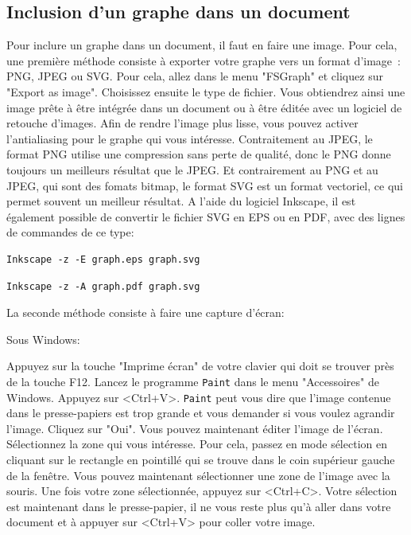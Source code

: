\subsection{Inclusion d’un graphe dans un document}
Pour inclure un graphe dans un document, il faut en faire une image. Pour cela, une
première méthode consiste à exporter votre graphe vers un format d'image~: PNG, JPEG ou SVG. Pour
cela, allez dans le menu "FSGraph" et cliquez sur "Export as image". Choisissez ensuite le type de
fichier. Vous obtiendrez ainsi une image prête à être intégrée dans un document ou
à être éditée avec un logiciel de retouche d’images. Afin de rendre l’image plus lisse, vous
pouvez activer l’antialiasing pour le graphe qui vous intéresse. Contraitement au JPEG, le format PNG
utilise une compression sans perte de qualité, donc le PNG donne toujours un meilleurs résultat que le
JPEG. Et contrairement au PNG et au JPEG, qui sont des fomats bitmap, le
format SVG est un format vectoriel, ce qui permet souvent un meilleur résultat. A l'aide du logiciel Inkscape, il
est également possible de convertir le fichier SVG en EPS ou en PDF, avec des lignes de commandes de ce type:
\begin{verbatim}
Inkscape -z -E graph.eps graph.svg
\end{verbatim}
\begin{verbatim}
Inkscape -z -A graph.pdf graph.svg
\end{verbatim}

\bigskip
\noindent La seconde méthode consiste à faire une capture d’écran:

\bigskip
\noindent Sous Windows:

\bigskip
\noindent Appuyez sur la touche "Imprime écran" de votre clavier qui doit se trouver près
de la touche F12. Lancez le programme \verb+Paint+ dans le menu "Accessoires" de Windows. Appuyez sur 
<Ctrl+V>. \verb+Paint+ peut vous dire que l’image contenue dans le presse-papiers
est trop grande et vous demander si vous voulez agrandir l’image. Cliquez sur "Oui". Vous
pouvez maintenant éditer l’image de l’écran. Sélectionnez la zone qui vous intéresse. Pour
cela, passez en mode sélection en cliquant sur le rectangle en pointillé qui se trouve dans
le coin supérieur gauche de la fenêtre. Vous pouvez maintenant sélectionner une zone de
l’image avec la souris. Une fois votre zone sélectionnée, appuyez sur <Ctrl+C>. Votre sélection
est maintenant dans le presse-papier, il ne vous reste plus qu’à aller dans votre document
et à appuyer sur <Ctrl+V> pour coller votre image.


